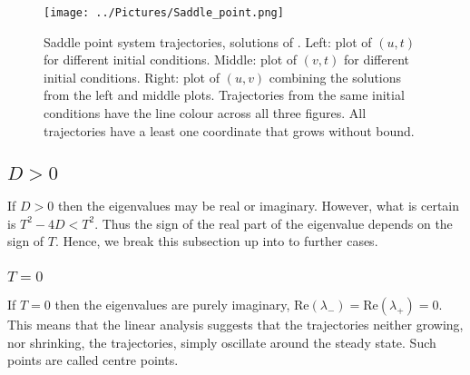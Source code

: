 \begin{figure}[!!!h!!!tb]
\centering
\texttt{[image: ../Pictures/Saddle\_point.png]}
\caption{\label{Saddle_point}Saddle point system trajectories, solutions of . Left: plot of $(u,t)$ for different initial conditions. Middle: plot of $(v,t)$ for different initial conditions. Right: plot of $(u,v)$ combining the solutions from the left and middle plots. Trajectories from the same initial conditions have the line colour across all three figures. All trajectories have a least one coordinate that grows without bound.}
\end{figure}

\subsection{$D>0$}
If $D>0$ then the eigenvalues may be real or imaginary. However, what is certain is $T^2-4D<T^2$. Thus the sign of the real part of the eigenvalue depends on the sign of $T$. Hence, we break this subsection up into to further cases.

\subsubsection{$T=0$}
If $T=0$ then the eigenvalues are purely imaginary, $\textrm{Re}(\lambda_-)= \textrm{Re}(\lambda_+)=0$. This means that the linear analysis suggests that the trajectories neither growing, nor shrinking, the trajectories, simply oscillate around the steady state. Such points are called centre points.

